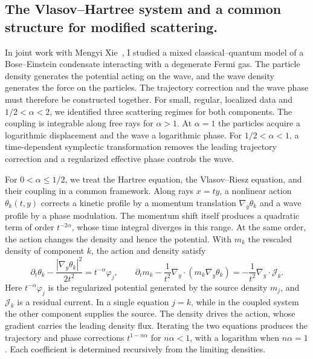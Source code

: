 \documentclass[reqno,10pt,a4paper]{amsart}
\numberwithin{equation}{section}
\begin{document}
\subsection*{The Vlasov--Hartree system and a common structure for modified scattering.}
In joint work with Mengyi Xie~\cite{HX26a,HX26b}, I studied a mixed classical--quantum model of a Bose--Einstein condensate interacting with a degenerate Fermi gas. The particle density generates the potential acting on the wave, and the wave density generates the force on the particles. The trajectory correction and the wave phase must therefore be constructed together. For small, regular, localized data and $1/2<\alpha<2$, we identified three scattering regimes for both components. The coupling is integrable along free rays for $\alpha>1$. At $\alpha=1$ the particles acquire a logarithmic displacement and the wave a logarithmic phase. For $1/2<\alpha<1$, a time-dependent symplectic transformation removes the leading trajectory correction and a regularized effective phase controls the wave.

For $0<\alpha\leq1/2$, we treat the Hartree equation, the Vlasov--Riesz equation, and their coupling in a common framework. Along rays $x=ty$, a nonlinear action $\theta_k(t,y)$ corrects a kinetic profile by a momentum translation $\nabla_y\theta_k$ and a wave profile by a phase modulation. The momentum shift itself produces a quadratic term of order $t^{-2\alpha}$, whose time integral diverges in this range. At the same order, the action changes the density and hence the potential. With $m_k$ the rescaled density of component $k$, the action and density satisfy
\[
 \partial_t\theta_k-\frac{|\nabla_y\theta_k|^2}{2t^2}=t^{-\alpha}\varphi_j,
 \qquad
 \partial_t m_k-\frac1{t^2}\nabla_y\!\cdot(m_k\nabla_y\theta_k)
 =-\frac1{t^2}\nabla_y\!\cdot\mathcal J_k .
\]
Here $t^{-\alpha}\varphi_j$ is the regularized potential generated by the source density $m_j$, and $\mathcal J_k$ is a residual current. In a single equation $j=k$, while in the coupled system the other component supplies the source. The density drives the action, whose gradient carries the leading density flux. Iterating the two equations produces the trajectory and phase corrections $t^{1-n\alpha}$ for $n\alpha<1$, with a logarithm when $n\alpha=1$. Each coefficient is determined recursively from the limiting densities.
\end{document}
